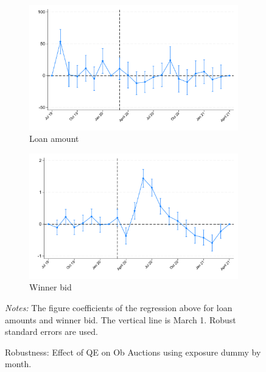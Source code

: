 \documentclass[11pt,a4paper]{article}
\begin{document}
  \begin{figure}[h]
    \centering
    \begin{subfigure}[b]{0.49\textwidth}
        \includegraphics[width=0.998\textwidth]{../results/figures/did_loan_amount_exposure_dummy.pdf}
        \caption{ Loan amount }\label{fig:loan_amount}
       \end{subfigure}
       \begin{subfigure}[b]{0.49\textwidth}
        \includegraphics[width=0.998\textwidth]{../results/figures/did_winner_bid_exposure_dummy.pdf}
        \caption{ Winner bid }\label{fig:winner_bid}
       \end{subfigure}
       \caption{Robustness: Effect of QE on Ob Auctions using exposure dummy by month. }\label{fig:did_exp_amount}
     \begin{minipage}{\textwidth}
        \footnotesize{\textit{Notes:}  The figure coefficients of the regression above for loan amounts and winner bid. The vertical line is March 1.  Robust standard errors are used. }
        \end{minipage}
  \end{figure}
  
\end{document}
